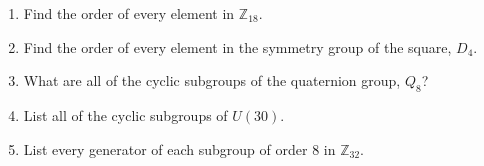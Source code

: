 {\begin{enumerate}
\begin{multicols}{3}
\begin{enumerate}
\item
$\displaystyle
\begin{pmatrix}
0 & 1 \\
-1 & 0
\end{pmatrix}
$

\item
$\displaystyle
\begin{pmatrix}
0 & 1/3 \\
3 & 0
\end{pmatrix}
$

\item
$\displaystyle
\begin{pmatrix}
1 & -1 \\
1 & 0
\end{pmatrix}
$

\item
$\displaystyle
\begin{pmatrix}
1 & -1 \\
0 & 1
\end{pmatrix}
$

\item
$\displaystyle
\begin{pmatrix}
1 & -1 \\
-1 & 0
\end{pmatrix}
$
 
\item
$\displaystyle
\begin{pmatrix}
\sqrt{3}/ 2 & 1/2 \\
-1/2 & \sqrt{3}/2
\end{pmatrix}
$

 \end{enumerate}
\end{multicols}

 

\item		  %
Find the order of every element in ${\mathbb Z}_{18}$.
 
 
\item
Find the order of every element in the symmetry group of the square,
$D_4$.
 
 
\item
What are all of the cyclic subgroups of the quaternion group, $Q_8$? 
 
 
\item
List all of the cyclic subgroups of $U(30)$.
 
 
\item
List every generator of each subgroup of order 8 in ${\mathbb
Z}_{32}$.
 

\end{enumerate}}
